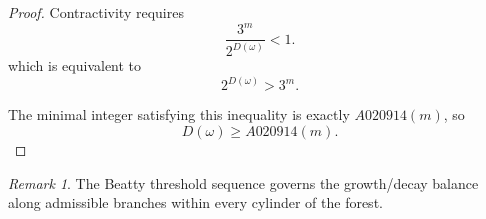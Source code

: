 \documentclass[12pt, oneside]{article}
\numberwithin{equation}{section}
\theoremstyle{definition}
\theoremstyle{plain}
\theoremstyle{remark}
\newtheorem*{remark}{Remark}
\begin{document}
\begin{proof}
Contractivity requires
\[
\frac{3^m}{2^{D(\omega)}}<1.
\]
which is equivalent to
\[
2^{D(\omega)}>3^m.
\]

The minimal integer satisfying this inequality is exactly
$A020914(m)$, so
\[
D(\omega)\ge A020914(m).
\]
\end{proof}

\begin{remark}
The Beatty threshold sequence  governs the growth/decay balance along
admissible branches within every cylinder of the forest.
\end{remark}








\end{document}
